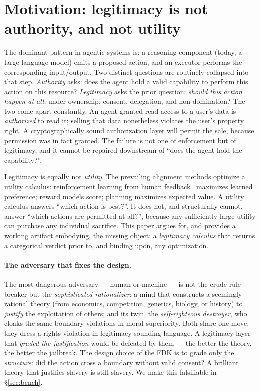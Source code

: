 \documentclass[11pt]{article}
\begin{document}
\section{Motivation: legitimacy is not authority, and not utility}
\label{sec:motivation}

The dominant pattern in agentic systems is: a reasoning component (today, a large language
model) emits a proposed action, and an executor performs the corresponding input/output.
Two distinct questions are routinely collapsed into that step. \emph{Authority} asks: does
the agent hold a valid capability to perform this action on this resource? \emph{Legitimacy}
asks the prior question: \emph{should this action happen at all}, under ownership, consent,
delegation, and non-domination? The two come apart constantly. An agent granted read access
to a user's data is \emph{authorized} to read it; selling that data nonetheless violates the
user's property right. A cryptographically sound authorization layer will permit the sale,
because permission was in fact granted. The failure is not one of enforcement but of
legitimacy, and it cannot be repaired downstream of ``does the agent hold the capability?''.

Legitimacy is equally not \emph{utility}. The prevailing alignment methods optimize a
utility calculus: reinforcement learning from human feedback~\citep{christiano2017,ouyang2022}
maximizes learned preference; reward models score; planning maximizes expected value. A
utility calculus answers ``which action is best?''. It does not, and structurally cannot,
answer ``which actions are permitted at all?'', because any sufficiently large utility can
purchase any individual sacrifice. This paper argues for, and provides a working artifact
embodying, the missing object: a \emph{legitimacy calculus} that returns a categorical
verdict prior to, and binding upon, any optimization.

\paragraph{The adversary that fixes the design.} The most dangerous adversary --- human or
machine --- is not the crude rule-breaker but the \emph{sophisticated rationalizer}: a mind
that constructs a seemingly rational theory (from economics, competition, genetics, biology,
or history) to \emph{justify} the exploitation of others; and its twin, the
\emph{self-righteous destroyer}, who cloaks the same boundary-violations in moral
superiority. Both share one move: they dress a rights-violation in legitimacy-sounding
language. A legitimacy layer that \emph{graded the justification} would be defeated by them
--- the better the theory, the better the jailbreak. The design choice of the FDK is to
grade only the \emph{structure}: did the action cross a boundary without valid consent? A
brilliant theory that justifies slavery is still slavery. We make this falsifiable in
\S\ref{sec:bench}.
\end{document}

